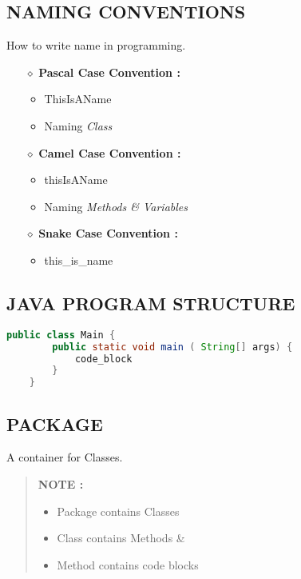 \subsection{NAMING CONVENTIONS}
How to write name in programming.
\begin{itemize}
	\item[{\LARGE $\diamond$}] \textbf{Pascal Case Convention :}
	\begin{itemize}
		\item ThisIsAName
		\item Naming \textsl{Class}
	\end{itemize}
		
		
	\item[{\LARGE $\diamond$}] \textbf{Camel Case Convention :}
	\begin{itemize}
		\item thisIsAName
		\item Naming \textsl{Methods \& Variables}
	\end{itemize}
	
	\item[{\LARGE $\diamond$}] \textbf{Snake Case Convention :}
	\begin{itemize}
		\item this\_is\_name
	\end{itemize}
	
\end{itemize}


\subsection{JAVA PROGRAM STRUCTURE}
\begin{lstlisting}[language=java]
	public class Main {
		public static void main ( String[] args) {
			code_block
		}
	}
\end{lstlisting}

\subsection{PACKAGE}
A container for Classes.

\begin{quotation}
	\textbf{NOTE :}
	\begin{itemize}
		\item Package contains Classes
		\item Class contains Methods \&
		\item Method contains code blocks
	\end{itemize}
\end{quotation}